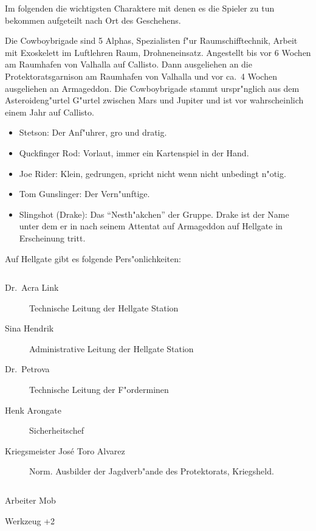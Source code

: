
Im folgenden die wichtigsten Charaktere mit denen es die Spieler zu tun bekommen aufgeteilt nach Ort des Geschehens.


Die Cowboybrigade sind 5 Alphas, Spezialisten f"ur Raumschifftechnik, Arbeit mit Exoskelett im Luftlehren Raum, Drohneneinsatz.
Angestellt bis vor 6 Wochen am Raumhafen von Valhalla auf Callisto. Dann ausgeliehen an die Protektoratsgarnison am Raumhafen von Valhalla und vor ca.~4 Wochen ausgeliehen an Armageddon. Die Cowboybrigade stammt urspr"nglich aus dem Asteroideng"urtel G"urtel zwischen Mars und Jupiter und ist vor wahrscheinlich einem Jahr auf Callisto.

\begin{itemize}
    \item Stetson: Der Anf"uhrer, gro\3 und dratig.
    \item Quckfinger Rod: Vorlaut, immer ein Kartenspiel in der Hand.
    \item Joe Rider: Klein, gedrungen, spricht nicht wenn nicht unbedingt n"otig.
    \item Tom Gunslinger: Der Vern"unftige.
    \item Slingshot (Drake): Das "`Nesth"akchen"' der Gruppe. Drake ist der Name unter dem er in nach seinem Attentat 
    auf Armageddon auf Hellgate in Erscheinung tritt.
\end{itemize}

\newpage


Auf Hellgate gibt es folgende Pers"onlichkeiten: 

\begin{column}[l]{0.45}
    \begin{description}
        \item[Dr.~Acra Link] Technische Leitung der Hellgate Station
        \item[Sina Hendrik] Administrative Leitung der Hellgate Station
        \item[Dr.~Petrova] Technische Leitung der F"orderminen
        \item[Henk Arongate] Sicherheitschef    
        \item[Kriegsmeister Jos\'{e} \frqq{}Toro\flqq{} Alvarez] Norm. Ausbilder der Jagdverb"ande des Protektorats, Kriegsheld.
    \end{description}
\end{column}
\begin{column}[r]{0.45}
    \begin{nscsheet}[h]{Arbeiter Mob}
        \nscstats[ATT=2,AGG=1,EMP=1,KNO=1,HP=10]
        \nscruler
        \begin{nscinventory}
            \nscitem[Waffen] Werkzeug +2            
        \end{nscinventory}
    \end{nscsheet}
\end{column}


